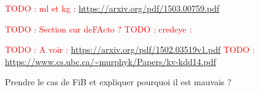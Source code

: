 \documentclass[12pt]{article}
\newcommand\todo[1]{\textcolor{red}{TODO : #1}}
\begin{document}
\todo{ml et kg : \url{https://arxiv.org/pdf/1503.00759.pdf}}

\todo{Section sur deFActo ? \cite{gerber2015}}
\todo{credeye : \cite{popat2018credeye}}

\todo{A voir : \url{https://arxiv.org/pdf/1502.03519v1.pdf}}
\todo{\url{https://www.cs.ubc.ca/~murphyk/Papers/kv-kdd14.pdf}}

Prendre le cas de FiB et expliquer pourquoi il est mauvais ?

\clearpage

\printbibliography[
heading=bibintoc,
title={Bibliographie}
]

\clearpage


\end{document}

